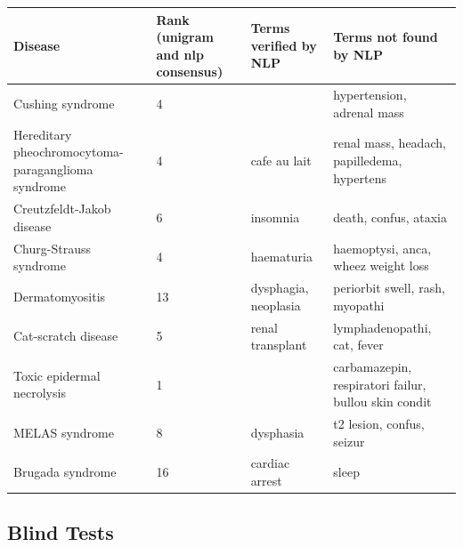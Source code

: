 \documentclass[10pt,letterpaper,final]{article}
\begin{document}
\begin{center}
\begin{small}
	\begin{longtable}{|p{3.5cm}|p{1.5cm}|p{3cm}|p{3cm}|}
	\hline
	\textbf{Disease}  & \textbf{Rank (unigram and nlp consensus)} & \textbf{Terms verified by NLP}  & \textbf{Terms not found by NLP} \\
	\hline\hline
Cushing syndrome & 4 &  & hypertension, adrenal mass \\ \hline
Hereditary pheochromocytoma-paraganglioma syndrome & 4 & cafe au lait & renal mass, headach, papilledema, hypertens \\ \hline
Creutzfeldt-Jakob disease & 6 & insomnia & death, confus, ataxia \\ \hline
Churg-Strauss syndrome & 4 & haematuria &  haemoptysi, anca, wheez weight loss \\ \hline
Dermatomyositis & 13 & dysphagia, neoplasia & periorbit swell, rash, myopathi \\ \hline
Cat-scratch disease & 5 & renal transplant & lymphadenopathi, cat, fever \\ \hline
Toxic epidermal necrolysis & 1 &  & carbamazepin, respiratori failur, bullou skin condit \\ \hline
MELAS syndrome & 8 & dysphasia & t2 lesion, confus, seizur \\ \hline
Brugada syndrome & 16 & cardiac arrest & sleep \\ \hline
	\end{longtable}
\end{small}
\end{center}

\subsection{Blind Tests}
\end{document}
